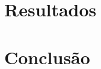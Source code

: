 \documentclass[12pt]{article}
\begin{document}
\section{Resultados}


\section{Conclusão}





\begin{thebibliography}{99}
		\label{BreastCancer}
\end{thebibliography}	
\end{document}
